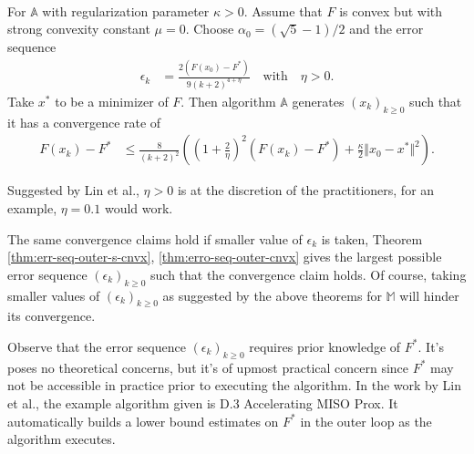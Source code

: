 \documentclass[12pt]{article}
\begin{document}
            \begin{theorem}\label{thm:erro-seq-outer-cnvx}\;\\
                For $\mathbb A$ with regularization parameter $\kappa > 0$. 
                Assume that $F$ is convex but with strong convexity constant $\mu = 0$. 
                Choose $\alpha_0 = (\sqrt{5} - 1)/2$ and the error sequence 
                \begin{align*}
                    \epsilon_k &= \frac{2(F(x_0) - F^*)}{9(k + 2)^{4 + \eta}} \quad 
                    \text{with}\quad \eta > 0. 
                \end{align*}
                Take $x^*$ to be a minimizer of $F$. 
                Then algorithm $\mathbb A$ generates $(x_k)_{k \ge0}$ such that it has a convergence rate of 
                \begin{align*}
                    F(x_k) - F^* &\le 
                    \frac{8}{(k + 2)^2}\left(
                        \left(1 + \frac{2}{\eta}\right)^2(F(x_k) - F^*)
                        + \frac{\kappa}{2}\Vert x_0 - x^*\Vert^2
                    \right).
                \end{align*}
            \end{theorem}
            \begin{remark}
                Suggested by Lin et al., $\eta > 0$ is at the discretion of the practitioners, for an example, $\eta = 0.1$ would work. 
            \end{remark}
            The same convergence claims hold if smaller value of $\epsilon_k$ is taken, Theorem \ref{thm:err-seq-outer-s-cnvx}, \ref{thm:erro-seq-outer-cnvx} gives the largest possible error sequence $(\epsilon_k)_{k \ge 0}$ such that the convergence claim holds. 
            Of course, taking smaller values of $(\epsilon_k)_{k \ge0}$ as suggested by the above theorems for $\mathbb M$ will hinder its convergence. 
            \par
            Observe that the error sequence $(\epsilon_k)_{k \ge 0}$ requires prior knowledge of $F^*$. 
            It's poses no theoretical concerns, but it's of upmost practical concern since $F^*$ may not be accessible in practice prior to executing the algorithm. 
            In the work by Lin et al., the example algorithm given is 
            D.3 Accelerating MISO Prox.
            It automatically builds a lower bound estimates on $F^*$ in the outer loop as the algorithm executes.
            \par 
\end{document}
